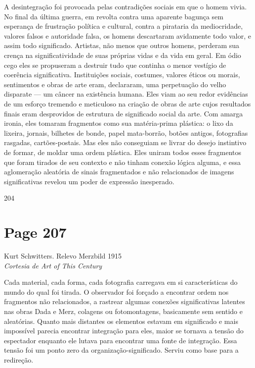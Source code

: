 \documentclass[a4paper]{article}
\begin{document}
A desintegração foi provocada pelas contradições sociais em que o homem vivia. No final da última guerra, em revolta contra uma aparente bagunça sem esperança de frustração política e cultural, contra a pirataria da mediocridade, valores falsos e autoridade falsa, os homens descartaram avidamente todo valor, e assim todo significado. Artistas, não menos que outros homens, perderam sua crença na significatividade de suas próprias vidas e da vida em geral. Em ódio cego eles se propuseram a destruir tudo que continha o menor vestígio de coerência significativa. Instituições sociais, costumes, valores éticos ou morais, sentimentos e obras de arte eram, declararam, uma perpetuação do velho disparate --- um câncer na existência humana. Eles viam ao seu redor evidências de um esforço tremendo e meticuloso na criação de obras de arte cujos resultados finais eram desprovidos de estrutura de significado social da arte. Com amarga ironia, eles tomaram fragmentos como sua matéria-prima plástica: o lixo da lixeira, jornais, bilhetes de bonde, papel mata-borrão, botões antigos, fotografias rasgadas, cartões-postais. Mas eles não conseguiam se livrar do desejo instintivo de formar, de moldar uma ordem plástica. Eles uniram todos esses fragmentos que foram tirados de seu contexto e não tinham conexão lógica alguma, e essa aglomeração aleatória de sinais fragmentados e não relacionados de imagens significativas revelou um poder de expressão inesperado.

204

\newpage
\section*{Page 207}

\begin{center}
Kurt Schwitters. Relevo Merzbild 1915 \\
\textit{Cortesia de Art of This Century}
\end{center}

Cada material, cada forma, cada fotografia carregava em si características do mundo do qual foi tirada. O observador foi forçado a encontrar ordem nos fragmentos não relacionados, a rastrear algumas conexões significativas latentes nas obras Dada e Merz, colagens ou fotomontagens, basicamente sem sentido e aleatórias. Quanto mais distantes os elementos estavam em significado e mais impossível parecia encontrar integração para eles, maior se tornava a tensão do espectador enquanto ele lutava para encontrar uma fonte de integração. Essa tensão foi um ponto zero da organização-significado. Serviu como base para a redireção.
\end{document}
